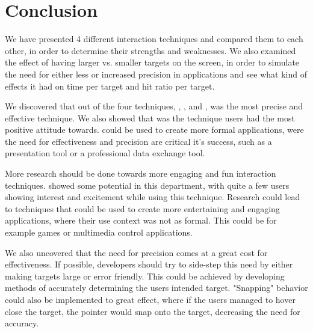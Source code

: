 \section{Conclusion}
We have presented 4 different interaction techniques and compared them to each other, in order to determine their strengths and weaknesses.
We also examined the effect of having larger vs. smaller targets on the screen, in order to simulate the need for either less or increased precision in applications and see what kind of effects it had on time per target and hit ratio per target. 

We discovered that out of the four techniques, \swipe, \throw, \tilt and \pinch, \swipe was the most precise and effective technique. We also showed that \swipe was the technique users had the most positive attitude towards. 
\swipe could be used to create more formal applications, were the need for effectiveness and precision are critical it's success, such as a presentation tool or a professional data exchange tool. 

More research should be done towards more engaging and fun interaction techniques.
\pinch showed some potential in this department, with quite a few users showing interest and excitement while using this technique.
Research could lead to techniques that could be used to create more entertaining and engaging applications, where their use context was not as formal. This could be for example games or multimedia control applications. 

We also uncovered that the need for precision comes at a great cost for effectiveness. 
If possible, developers should try to side-step this need by either making targets large or error friendly.
This could be achieved by developing methods of accurately determining the users intended target.
"Snapping" behavior could also be implemented to great effect, where if the users managed to hover close the target, the pointer would snap onto the target, decreasing the need for accuracy. 